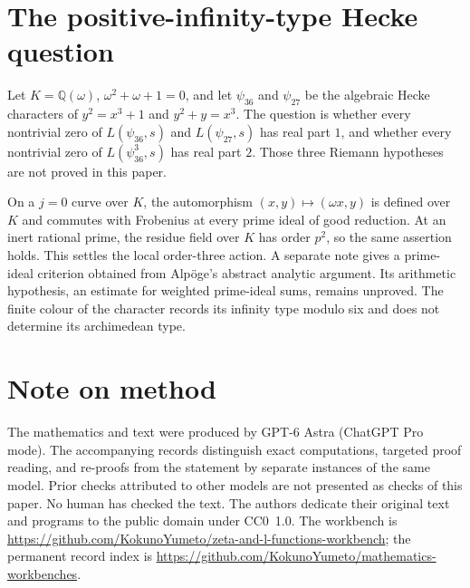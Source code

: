 \documentclass[11pt]{amsart}
\theoremstyle{definition}
\theoremstyle{remark}
\newcommand{\Q}{\mathbb Q}
\newcommand{\workbenchurl}{https://github.com/KokunoYumeto/zeta-and-l-functions-workbench}
\newcommand{\recordurl}{https://github.com/KokunoYumeto/mathematics-workbenches}
\begin{document}
\section{The positive-infinity-type Hecke question}
Let $K=\Q(\omega)$, $\omega^2+\omega+1=0$, and let $\psi_{36}$ and
$\psi_{27}$ be the algebraic Hecke characters of
$y^2=x^3+1$ and $y^2+y=x^3$. The question is whether every nontrivial
zero of $L(\psi_{36},s)$ and $L(\psi_{27},s)$ has real part $1$, and
whether every nontrivial zero of $L(\psi_{36}^3,s)$ has real part $2$.
Those three Riemann hypotheses are not proved in this paper.

On a $j=0$ curve over $K$, the automorphism
$(x,y)\mapsto(\omega x,y)$ is defined over $K$ and commutes with
Frobenius at every prime ideal of good reduction. At an inert rational
prime, the residue field over $K$ has order $p^2$, so the same assertion
holds. This settles the local order-three action. A separate note gives
a prime-ideal criterion obtained from Alp\"oge's abstract analytic
argument. Its arithmetic hypothesis, an estimate for weighted prime-ideal
sums, remains unproved. The finite colour of the character records its
infinity type modulo six and does not determine its archimedean type.

\section*{Note on method}
The mathematics and text were produced by GPT-6 Astra (ChatGPT Pro mode).
The accompanying records distinguish exact computations, targeted proof
reading, and re-proofs from the statement by separate instances of the
same model. Prior checks attributed to other models are not presented as
checks of this paper. No human has checked the text. The authors dedicate
their original text and programs to the public domain under CC0~1.0.
The workbench is \url{\workbenchurl}; the permanent record index is
\url{\recordurl}.



\end{document}
